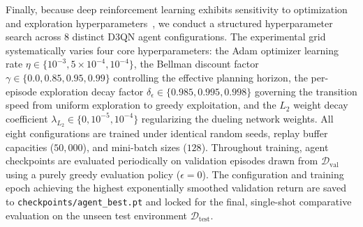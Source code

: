 Finally, because deep reinforcement learning exhibits sensitivity to optimization and exploration hyperparameters~\cite{sutton2018reinforcement, mnih2015human}, we conduct a structured hyperparameter search across $8$ distinct D3QN agent configurations. The experimental grid systematically varies four core hyperparameters: the Adam optimizer learning rate $\eta \in \{10^{-3}, 5\times 10^{-4}, 10^{-4}\}$, the Bellman discount factor $\gamma \in \{0.0, 0.85, 0.95, 0.99\}$ controlling the effective planning horizon, the per-episode exploration decay factor $\delta_\epsilon \in \{0.985, 0.995, 0.998\}$ governing the transition speed from uniform exploration to greedy exploitation, and the $L_2$ weight decay coefficient $\lambda_{L_2} \in \{0, 10^{-5}, 10^{-4}\}$ regularizing the dueling network weights. All eight configurations are trained under identical random seeds, replay buffer capacities ($50{,}000$), and mini-batch sizes ($128$). Throughout training, agent checkpoints are evaluated periodically on validation episodes drawn from $\mathcal{D}_{\text{val}}$ using a purely greedy evaluation policy ($\epsilon = 0$). The configuration and training epoch achieving the highest exponentially smoothed validation return are saved to \texttt{checkpoints/agent\_best.pt} and locked for the final, single-shot comparative evaluation on the unseen test environment $\mathcal{D}_{\text{test}}$.
